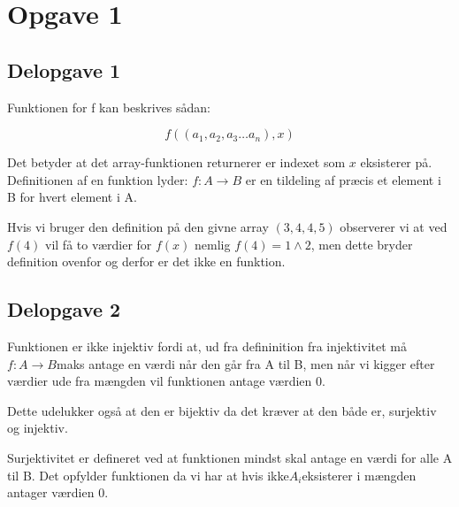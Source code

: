\section{Opgave 1}\label{sec:opgave-1}

\subsection {Delopgave 1}\label{subsec:delopgave-2-1}

Funktionen for f kan beskrives sådan:

\begin{equation}
    \label{eq:1}
    f((a_{1}, a_{2}, a_{3} \dots a_{n}), x)
\end {equation}

Det betyder at det array-funktionen returnerer er indexet som $x$ eksisterer på.
Definitionen af en funktion lyder: $f: A \rightarrow B $ er en tildeling af præcis et element i B
for hvert element i A\@.

Hvis vi bruger den definition på den givne array \(\left(3, 4, 4, 5\right)\) observerer vi at ved \(f(4)\) vil få to
værdier for \(f(x)\) nemlig \(f(4) = 1 \wedge 2\), men dette bryder definition ovenfor og derfor er det ikke en
funktion.

\subsection{Delopgave 2}\label{subsec:delopgave-22}

Funktionen er ikke injektiv fordi at, ud fra defininition fra injektivitet må
\( f: A \rightarrow B \)maks antage en værdi når den går fra A til B, men når vi kigger efter værdier
ude fra mængden vil funktionen antage værdien 0.

Dette udelukker også at den er bijektiv da det kræver at den både er, surjektiv og injektiv.

Surjektivitet er defineret ved at funktionen mindst skal antage en værdi for alle A til B\@.
Det opfylder funktionen da vi har at hvis ikke\(A_{i}\)eksisterer i mængden antager værdien 0.


